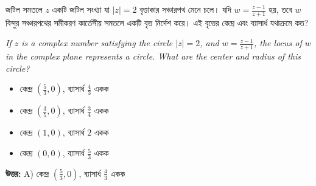 \documentclass[12pt, a4paper]{article}
\begin{document}
\begin{tcolorbox}[questionbox={প্রশ্ন (Question) 39}]
    \noindent
    জটিল সমতলে $z$ একটি জটিল সংখ্যা যা $|z| = 2$ বৃত্তাকার সঞ্চারপথ মেনে চলে। যদি $w = \frac{z - 1}{z + 1}$ হয়, তবে $w$ বিন্দুর সঞ্চারপথের সমীকরণ কার্তেসীয় সমতলে একটি বৃত্ত নির্দেশ করে। এই বৃত্তের কেন্দ্র এবং ব্যাসার্ধ যথাক্রমে কত?
    
    \vspace{0.8em}
    \begin{english}
    \noindent\textit{\color{darkgray}
    If $z$ is a complex number satisfying the circle $|z| = 2$, and $w = \frac{z - 1}{z + 1}$, the locus of $w$ in the complex plane represents a circle. What are the center and radius of this circle?
    }
    \end{english}
\end{tcolorbox}

\vspace{1em}
\begin{itemize}[label={}, leftmargin=1cm, itemsep=0.5em]
    \item[\textbf{A)}] কেন্দ্র $\left(\frac{5}{3}, 0\right)$, ব্যাসার্ধ $\frac{4}{3}$ একক
    \item[\textbf{B)}] কেন্দ্র $\left(\frac{3}{5}, 0\right)$, ব্যাসার্ধ $\frac{3}{4}$ একক
    \item[\textbf{C)}] কেন্দ্র $(1, 0)$, ব্যাসার্ধ $2$ একক
    \item[\textbf{D)}] কেন্দ্র $(0, 0)$, ব্যাসার্ধ $\frac{5}{3}$ একক
\end{itemize}

\vspace{0.5em}
\begin{tcolorbox}[answerbox]
    \textbf{\color{success} উত্তর:} A) কেন্দ্র $\left(\frac{5}{3}, 0\right)$, ব্যাসার্ধ $\frac{4}{3}$ একক
\end{tcolorbox}
\vspace{1em}
\end{document}

